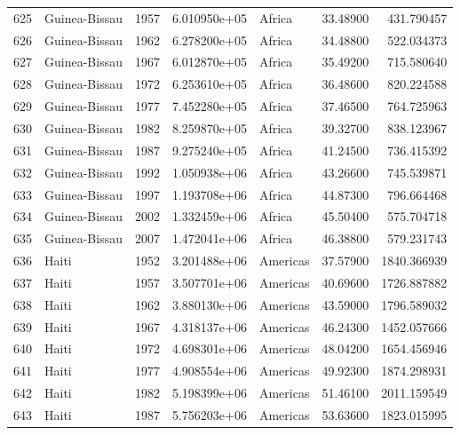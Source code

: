\documentclass[
  letterpaper,
  DIV=11,
  numbers=noendperiod]{scrreprt}
\begin{document}
\begin{tabular}{llrrlrr}
625  &             Guinea-Bissau &  1957 &  6.010950e+05 &    Africa &  33.48900 &     431.790457 \\
626  &             Guinea-Bissau &  1962 &  6.278200e+05 &    Africa &  34.48800 &     522.034373 \\
627  &             Guinea-Bissau &  1967 &  6.012870e+05 &    Africa &  35.49200 &     715.580640 \\
628  &             Guinea-Bissau &  1972 &  6.253610e+05 &    Africa &  36.48600 &     820.224588 \\
629  &             Guinea-Bissau &  1977 &  7.452280e+05 &    Africa &  37.46500 &     764.725963 \\
630  &             Guinea-Bissau &  1982 &  8.259870e+05 &    Africa &  39.32700 &     838.123967 \\
631  &             Guinea-Bissau &  1987 &  9.275240e+05 &    Africa &  41.24500 &     736.415392 \\
632  &             Guinea-Bissau &  1992 &  1.050938e+06 &    Africa &  43.26600 &     745.539871 \\
633  &             Guinea-Bissau &  1997 &  1.193708e+06 &    Africa &  44.87300 &     796.664468 \\
634  &             Guinea-Bissau &  2002 &  1.332459e+06 &    Africa &  45.50400 &     575.704718 \\
635  &             Guinea-Bissau &  2007 &  1.472041e+06 &    Africa &  46.38800 &     579.231743 \\
636  &                     Haiti &  1952 &  3.201488e+06 &  Americas &  37.57900 &    1840.366939 \\
637  &                     Haiti &  1957 &  3.507701e+06 &  Americas &  40.69600 &    1726.887882 \\
638  &                     Haiti &  1962 &  3.880130e+06 &  Americas &  43.59000 &    1796.589032 \\
639  &                     Haiti &  1967 &  4.318137e+06 &  Americas &  46.24300 &    1452.057666 \\
640  &                     Haiti &  1972 &  4.698301e+06 &  Americas &  48.04200 &    1654.456946 \\
641  &                     Haiti &  1977 &  4.908554e+06 &  Americas &  49.92300 &    1874.298931 \\
642  &                     Haiti &  1982 &  5.198399e+06 &  Americas &  51.46100 &    2011.159549 \\
643  &                     Haiti &  1987 &  5.756203e+06 &  Americas &  53.63600 &    1823.015995 \\

\end{tabular}
\end{document}
